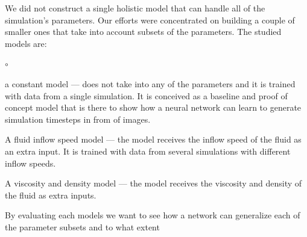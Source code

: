 \documentclass{llncs}
\begin{document}
We did not construct a single holistic model that can handle all of the simulation's parameters. Our efforts were concentrated on building a couple of smaller ones that take into account subsets of the parameters. The studied models are:
\begin{list}{$\circ$}{}
\item a constant model --- does not take into any of the parameters and it is trained with data from a single simulation. It is conceived as a baseline and proof of concept model that is there to show how a neural network can learn to generate simulation timesteps in from of images.
\item A fluid inflow speed model --- the model receives the inflow speed of the fluid as an extra input. It is trained with data from several simulations with different inflow speeds.
\item A viscosity and density model --- the model receives the viscosity and density of the fluid as extra inputs.
\end{list}
By evaluating each models we want to see how a network can generalize each of the parameter subsets and to what extent
\end{document}
